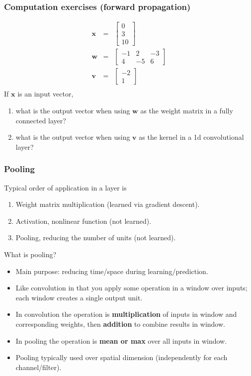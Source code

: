 \documentclass{beamer}
\begin{document}
\begin{frame}
  \frametitle{Computation exercises (forward propagation)}
  \begin{eqnarray*}
    \mathbf x &=& \begin{bmatrix}
      0 \\
      3 \\
      10
    \end{bmatrix}\\
    \mathbf w &=& \begin{bmatrix}
      -1 & 2 & -3 \\
      4 & -5 & 6
    \end{bmatrix}\\
    \mathbf v &=& \begin{bmatrix}
      -2 \\
      1
    \end{bmatrix}\\
  \end{eqnarray*}
  If $\mathbf x$ is an input vector,
  \begin{enumerate}
  \item what is the output vector when using $\mathbf w$ as the weight
    matrix in a fully connected layer?
  \item what is the output vector when using $\mathbf v$ as the kernel
    in a 1d convolutional layer?
  \end{enumerate}
\end{frame}
  
\begin{frame}
  \frametitle{Pooling}
  Typical order of application in a layer is
  \begin{enumerate}
  \item Weight matrix multiplication (learned via gradient descent).
  \item Activation, nonlinear function (not learned).
  \item Pooling, reducing the number of units (not learned).
  \end{enumerate}
  What is pooling? 
  \begin{itemize}
  \item Main purpose: reducing time/space during learning/prediction.
  \item Like convolution in that you apply some operation in a window
    over inputs; each window creates a single output unit.
  \item In convolution the operation is \textbf{multiplication} of inputs in
    window and corresponding weights, then \textbf{addition} to combine results
    in window.
  \item In pooling the operation is \textbf{mean or max} over all inputs in
    window.
  \item Pooling typically used over spatial dimension (independently
    for each channel/filter). 
  \end{itemize}
\end{frame}
\end{document}
